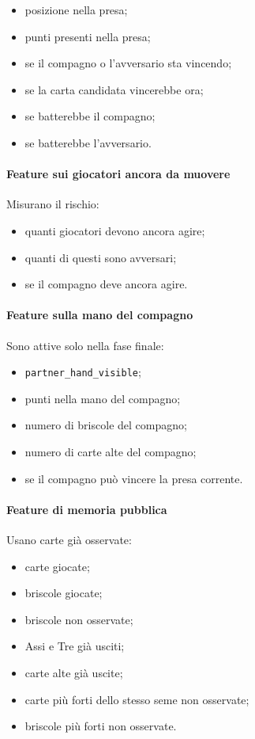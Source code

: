 \documentclass[11pt,a4paper]{article}
\begin{document}
\begin{itemize}
  \item posizione nella presa;
  \item punti presenti nella presa;
  \item se il compagno o l'avversario sta vincendo;
  \item se la carta candidata vincerebbe ora;
  \item se batterebbe il compagno;
  \item se batterebbe l'avversario.
\end{itemize}

\paragraph{Feature sui giocatori ancora da muovere}

Misurano il rischio:

\begin{itemize}
  \item quanti giocatori devono ancora agire;
  \item quanti di questi sono avversari;
  \item se il compagno deve ancora agire.
\end{itemize}

\paragraph{Feature sulla mano del compagno}

Sono attive solo nella fase finale:

\begin{itemize}
  \item \texttt{partner\_hand\_visible};
  \item punti nella mano del compagno;
  \item numero di briscole del compagno;
  \item numero di carte alte del compagno;
  \item se il compagno può vincere la presa corrente.
\end{itemize}

\paragraph{Feature di memoria pubblica}

Usano carte già osservate:

\begin{itemize}
  \item carte giocate;
  \item briscole giocate;
  \item briscole non osservate;
  \item Assi e Tre già usciti;
  \item carte alte già uscite;
  \item carte più forti dello stesso seme non osservate;
  \item briscole più forti non osservate.
\end{itemize}
\end{document}
